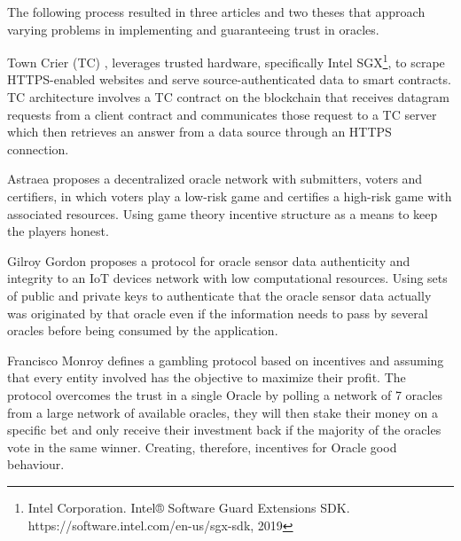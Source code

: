 The following process resulted in three articles and two theses that approach varying problems in implementing and guaranteeing trust in oracles.

Town Crier (TC) \cite{Zhang2016TownCrier}, leverages trusted hardware, specifically Intel SGX\footnote{Intel Corporation. Intel® Software Guard Extensions
SDK. https://software.intel.com/en-us/sgx-sdk, 2019}, to scrape HTTPS-enabled websites and serve source-authenticated data to smart contracts. TC architecture involves a TC contract on the blockchain that receives datagram requests from a client contract and communicates those request to a TC server which then retrieves an answer from a data source through an HTTPS connection.



Astraea \cite{Adler2018Astraea:Oracleb} proposes a decentralized oracle network with submitters, voters and certifiers, in which voters play a low-risk game and certifies a high-risk game with associated resources. Using game theory incentive structure as a means to keep the players honest.


Gilroy Gordon \cite{Gordon2017ProvenanceSensorsb} proposes a protocol for oracle sensor data authenticity and integrity to an IoT devices network with low computational resources. Using sets of public and private keys to authenticate that the oracle sensor data actually was originated by that oracle even if the information needs to pass by several oracles before being consumed by the application.

Francisco Monroy \cite{MontotoMonroy2018BitcoinBlockchain} defines a gambling protocol based on incentives and assuming that every entity involved has the objective to maximize their profit. The protocol overcomes the trust in a single Oracle by polling a network of 7 oracles from a large network of available oracles, they will then stake their money on a specific bet and only receive their investment back if the majority of the oracles vote in the same winner. Creating, therefore, incentives for Oracle good behaviour.

